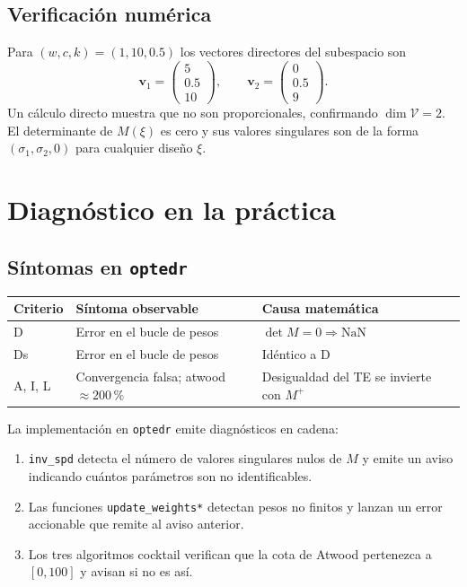 \documentclass[11pt, a4paper]{article}
\begin{document}
\subsection{Verificaci\'on num\'erica}

Para $(w, c, k) = (1, 10, 0.5)$ los vectores directores del subespacio son
\[
  \mathbf{v}_1 = \begin{pmatrix} 5 \\ 0.5 \\ 10 \end{pmatrix},
  \qquad
  \mathbf{v}_2 = \begin{pmatrix} 0 \\ 0.5 \\ 9 \end{pmatrix}.
\]
Un c\'alculo directo muestra que no son proporcionales, confirmando $\dim\mathcal{V} = 2$.
El determinante de $M(\xi)$ es cero y sus valores singulares son de la forma
$(\sigma_1, \sigma_2, 0)$ para cualquier dise\~no $\xi$.

\section{Diagn\'ostico en la pr\'actica}

\subsection{S\'intomas en \texttt{optedr}}

\begin{center}
\renewcommand{\arraystretch}{1.2}
\begin{tabular}{@{}lll@{}}
  \toprule
  Criterio & S\'intoma observable & Causa matem\'atica \\
  \midrule
  D & Error en el bucle de pesos & $\det M = 0 \Rightarrow \text{NaN}$ \\
  Ds & Error en el bucle de pesos & Id\'entico a D \\
  A, I, L & Convergencia falsa; atwood $\approx 200\,\%$ &
    Desigualdad del TE se invierte con $M^+$ \\
  \bottomrule
\end{tabular}
\end{center}

La implementaci\'on en \texttt{optedr} emite diagn\'osticos en cadena:
\begin{enumerate}
  \item \texttt{inv\_spd} detecta el n\'umero de valores singulares nulos de $M$
        y emite un aviso indicando cuántos par\'ametros son no identificables.
  \item Las funciones \texttt{update\_weights*} detectan pesos no finitos y lanzan un error
        accionable que remite al aviso anterior.
  \item Los tres algoritmos cocktail verifican que la cota de Atwood pertenezca a $[0, 100]$
        y avisan si no es as\'i.
\end{enumerate}
\end{document}
